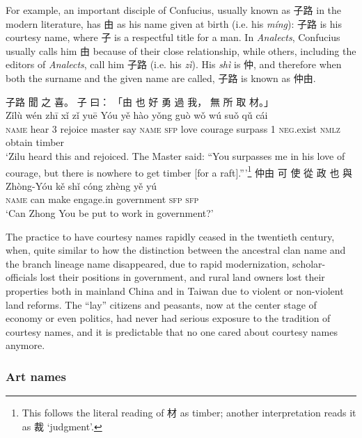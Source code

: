 \documentclass[UTF8, a4paper, oneside, scheme=plain, 12pt]{ctexrep}
\newcommand{\form}[1]{\emph{#1}}
\newcommand{\translate}[1]{`#1'}
\newcommand*{\category}[1]{\textsc{#1}}
\begin{document}
For example, an important disciple of Confucius, usually known as 子路 in the modern literature,
has 由 as his name given at birth (i.e. his \form{míng}):
子路 is his courtesy name, where 子 is a respectful title for a man.
In \form{Analects}, Confucius usually calls him 由 because of their close relationship,
while others, including the editors of \form{Analects}, call him 子路 (i.e. his \form{zì}).
His \form{shì} is 仲, and therefore when both the surname and the given name are called,
子路 is known as 仲由.

\begin{exe}
    \ex
    \glll 子路 聞 之 喜。 子 曰： 「由 也 好 勇 過 我， 無 所 取 材。」 \\
    Zǐlù wén zhī xǐ zǐ yuē Yóu yě hào yǒng guò wǒ wú suǒ qǔ cái \\
    \category{name} hear 3 rejoice master say \category{name} \category{sfp} love courage surpass 1 \category{neg}.exist \category{nmlz} obtain timber \\
    \glt\translate{Zilu heard this and rejoiced. The Master said: ``You surpasses me in his love of courage, but there is nowhere to get timber [for a raft].''}\footnote{This follows the literal reading of 材 as timber; another interpretation reads it as 裁 \translate{judgment}.}
    \ex
    \glll 仲由 可 使 從 政 也 與 \\
    Zhòng-Yóu kě shǐ cóng zhèng yě yú \\
    \category{name} can make engage.in government \category{sfp} \category{sfp} \\
    \glt\translate{Can Zhong You be put to work in government?}
\end{exe}

The practice to have courtesy names rapidly ceased in the twentieth century,
when, quite similar to how the distinction between the ancestral clan name and the branch lineage name disappeared,
due to rapid modernization, scholar-officials lost their positions in government,
and rural land owners lost their properties both in mainland China and in Taiwan
due to violent or non-violent land reforms.
The ``lay'' citizens and peasants, now at the center stage of economy or even politics,
had never had serious exposure to the tradition of courtesy names,
and it is predictable that no one cared about courtesy names anymore.

\subsubsection{Art names}
\end{document}
